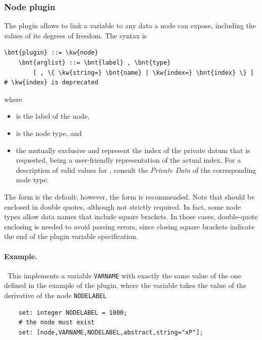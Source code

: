 \subsubsection{Node plugin}
The  plugin allows to link a variable to any data a node
can expose, including the values of its degrees of freedom.
The syntax is
\begin{Verbatim}[commandchars=\\\{\}]
    \bnt{plugin} ::= \kw{node}
    \bnt{arglist} ::= \bnt{label} , \bnt{type}
        [ , \{ \kw{string=} \bnt{name} | \kw{index=} \bnt{index} \} ] # \kw{index} is deprecated
\end{Verbatim}
where
\begin{itemize}
\item {} is the label of the node,
\item {} is the node type, and
\item the mutually exclusive  and  represent the index
of the private datum that is requested,  being a user-friendly
representation of the actual index.
For a description of valid values for , consult the \emph{Private Data} of the corresponding node type.
\end{itemize}
The  form is the default; however, the  form is recommended.
Note that  should be enclosed in double quotes,
although not strictly required.
In fact, some node types allow data names that include square brackets.
In those cases, double-quote enclosing is needed to avoid parsing errors,
since closing square brackets indicate the end
of the plugin variable specification.

\paragraph{Example.} \
This implements a variable \texttt{VARNAME} with exactly the same value
of the one defined in the example of the \kw{dof} plugin,
where the variable takes the value of the derivative
of the  node \texttt{NODELABEL}
\begin{verbatim}
    set: integer NODELABEL = 1000;
    # the node must exist
    set: [node,VARNAME,NODELABEL,abstract,string="xP"];
\end{verbatim}



